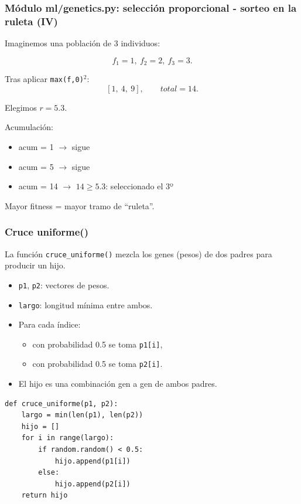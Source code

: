\documentclass[
	11pt, %
]{beamer}
\begin{document}

\begin{frame}
\frametitle{Módulo ml/genetics.py: selección proporcional - sorteo en la ruleta (IV)}

Imaginemos una población de 3 individuos:

\[
f_1=1,\ f_2=2,\ f_3=3.
\]

Tras aplicar \texttt{max(f,0)\(^2\)}:
\[
[1,\ 4,\ 9],\qquad total = 14.
\]

Elegimos \(r=5.3\).

\vspace{5pt}

Acumulación:
\begin{itemize}
    \item acum = 1  \(\rightarrow\) sigue
    \item acum = 5  \(\rightarrow\) sigue
    \item acum = 14 \(\rightarrow\) \(14 \ge 5.3\): seleccionado el 3º
\end{itemize}

Mayor fitness = mayor tramo de “ruleta”.

\end{frame}


\begin{frame}[fragile]
\frametitle{Cruce uniforme()}

La función \texttt{cruce\_uniforme()} mezcla los genes (pesos) de dos padres para
producir un hijo.

\begin{itemize}
    \item \texttt{p1}, \texttt{p2}: vectores de pesos.
    \item \texttt{largo}: longitud mínima entre ambos.
    \item Para cada índice:
    \begin{itemize}
        \item con probabilidad 0.5 se toma \texttt{p1[i]},
        \item con probabilidad 0.5 se toma \texttt{p2[i]}.
    \end{itemize}
    \item El hijo es una combinación gen a gen de ambos padres.
\end{itemize}

{\scriptsize
\begin{verbatim}
def cruce_uniforme(p1, p2):
    largo = min(len(p1), len(p2))
    hijo = []
    for i in range(largo):
        if random.random() < 0.5:
            hijo.append(p1[i])
        else:
            hijo.append(p2[i])
    return hijo
\end{verbatim}
}
\end{frame}
\end{document}
